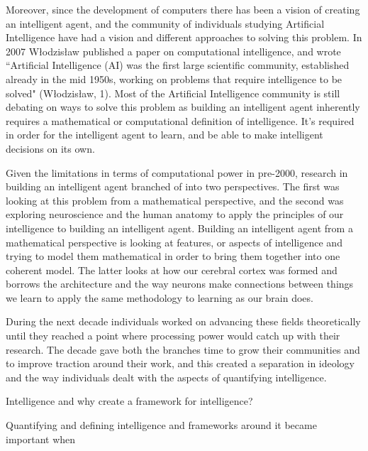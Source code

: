 \documentclass[11pt, oneside]{article}
\begin{document}
\par Moreover, since the development of computers there has been a vision of creating an intelligent agent, and the community of individuals studying Artificial Intelligence have had a vision and different approaches to solving this problem. In 2007 W\l{}odzis\l{}aw published a paper on computational intelligence, and wrote ``Artificial Intelligence (AI) was the first large scientific community, established already in the mid 1950s, working on problems that require intelligence to be solved" (W\l{}odzis\l{}aw, 1). Most of the Artificial Intelligence community is still debating on ways to solve this problem as building an intelligent agent inherently requires a mathematical or computational definition of intelligence. It's required in order for the intelligent agent to learn, and be able to make intelligent decisions on its own. 
\par Given the limitations in terms of computational power in pre-2000, research in building an intelligent agent branched of into two perspectives. The first was looking at this problem from a mathematical perspective, and the second was exploring neuroscience and the human anatomy to apply the principles of our intelligence to building an intelligent agent. Building an intelligent agent from a mathematical perspective is looking at features, or aspects of intelligence and trying to model them mathematical in order to bring them together into one coherent model. The latter looks at how our cerebral cortex was formed and borrows the architecture and the way neurons make connections between things we learn to apply the same methodology to learning as our brain does. 
\par During the next decade individuals worked on advancing these fields theoretically until they reached a point where processing power would catch up with their research. The decade gave both the branches time to grow their communities and to improve traction around their work, and this created a separation in ideology and the way individuals dealt with the aspects of quantifying intelligence. 

\par Intelligence and why create a framework for intelligence?
\par Quantifying and defining intelligence and frameworks around it became important when


\end{document}
